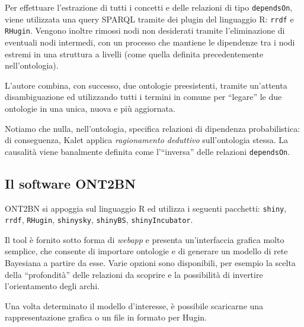 Per effettuare l'estrazione di tutti i concetti e delle relazioni di tipo \texttt{dependsOn}, viene utilizzata una query SPARQL tramite dei plugin del linguaggio R: \texttt{rrdf} e \texttt{RHugin}. Vengono inoltre rimossi nodi non desiderati tramite l'eliminazione di eventuali nodi intermedi, con un processo che mantiene le dipendenze tra i nodi estremi in una struttura a livelli (come quella definita precedentemente nell'ontologia).

L'autore combina, con successo, due ontologie preesistenti, tramite un'attenta disambiguazione ed utilizzando tutti i termini in comune per ``legare'' le due ontologie in una unica, nuova e più aggiornata.

Notiamo che nulla, nell'ontologia, specifica relazioni di dipendenza probabilistica: di conseguenza, Kalet applica \textit{ragionamento deduttivo} sull'ontologia stessa. La causalità viene banalmente definita come l'``inversa'' delle relazioni \texttt{dependsOn}.


\subsection{Il software ONT2BN}
ONT2BN si appoggia sul linguaggio R ed utilizza i seguenti pacchetti\cite{ont2bn_2015}: \texttt{shiny}, \texttt{rrdf}, \texttt{RHugin}, \texttt{shinysky},	\texttt{shinyBS}, \texttt{shinyIncubator}.

Il tool è fornito sotto forma di \textit{webapp} e presenta un'interfaccia grafica molto semplice, che consente di importare ontologie e di generare un modello di rete Bayesiana a partire da esse. Varie opzioni sono disponibili, per esempio la scelta della ``profondità'' delle relazioni da scoprire e la possibilità di invertire l'orientamento degli archi.

Una volta determinato il modello d'interesse, è possibile scaricarne una rappresentazione grafica o un file in formato per Hugin\cite{hugin}.




